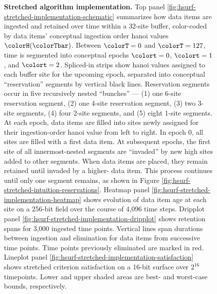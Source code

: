 \begin{figure}[htbp!]
\vspace{-2ex}\caption{%
  \textbf{Stretched algorithm implementation.}
  \footnotesize
  Top panel \ref{fig:hsurf-stretched-implementation-schematic} summarizes how data items are ingested and retained over time within a 32-site buffer, color-coded by data items' conceptual ingestion order hanoi values $\colorH(\colorTbar)$.
  Between $\colorT=0$ and $\colorT=127$, time is segmented into conceptual epochs $\colort=0$, $\colort=1$, and $\colort=2$.
  Spliced-in strips show hanoi values assigned to each buffer site for the upcoming epoch, separated into conceptual ``reservation'' segments by vertical black lines.
  Reservation segments occur in five recursively nested ``bunches'' --- (1) one 6-site reservation segment, (2) one 4-site reservation segment, (3) two 3-site segments, (4) four 2-site segments, and (5) eight 1-site segments.
  At each epoch, data items are filled into sites newly assigned for their ingestion-order hanoi value from left to right.
  In epoch 0, all sites are filled with a first data item.
  At subsequent epochs, the first site of all innermost-nested segments are ``invaded'' by new high \hv{} sites added to other segments.
  When data items are placed, they remain retained until invaded by a higher-\hv{} data item.
  This process continues until only one segment remains, as shown in Figure \ref{fig:hsurf-stretched-intuition-reservations}.
  Heatmap panel \ref{fig:hsurf-stretched-implementation-heatmap} shows evolution of data item age at each site on a 256-bit field over the course of 4,096 time steps.
  Dripplot panel \ref{fig:hsurf-stretched-implementation-dripplot} shows retention spans for 3,000 ingested time points.
  Vertical lines span durations between ingestion and elimination for data items from successive time points.
  Time points previously eliminated are marked in red.
  Lineplot panel \ref{fig:hsurf-stretched-implementation-satisfaction} shows stretched criterion satisfaction on a 16-bit surface over $2^{16}$ timepoints.
  Lower and upper shaded areas are best- and worst-case bounds, respectively.
  }
\label{fig:hsurf-stretched-implementation}

\end{figure}

